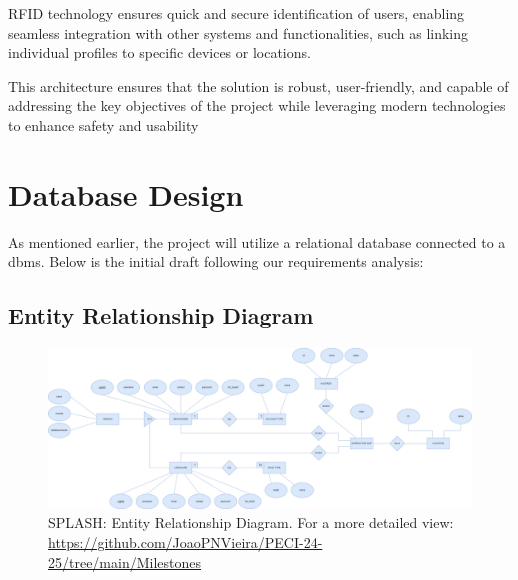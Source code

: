 RFID technology ensures quick and secure identification of users, enabling seamless integration with other systems and functionalities, such as linking individual profiles to specific devices or locations.

This architecture ensures that the solution is robust, user-friendly, and capable of addressing the key objectives of the project while leveraging modern technologies to enhance safety and usability

\section{Database Design}
\label{section:dbdesign}

As mentioned earlier, the project will utilize a relational database connected to a \ac{dbms}. Below is the initial draft following our requirements analysis:

\subsection{Entity Relationship Diagram}
\label{subsection:DER}

    \begin{figure}[H]
          \centering
          \includegraphics[width=16cm]{figs/DER.png}
          \caption{SPLASH: Entity Relationship Diagram. For a more detailed view: \url{https://github.com/JoaoPNVieira/PECI-24-25/tree/main/Milestones}}
          \label{fig:DER}
    \end{figure}


    